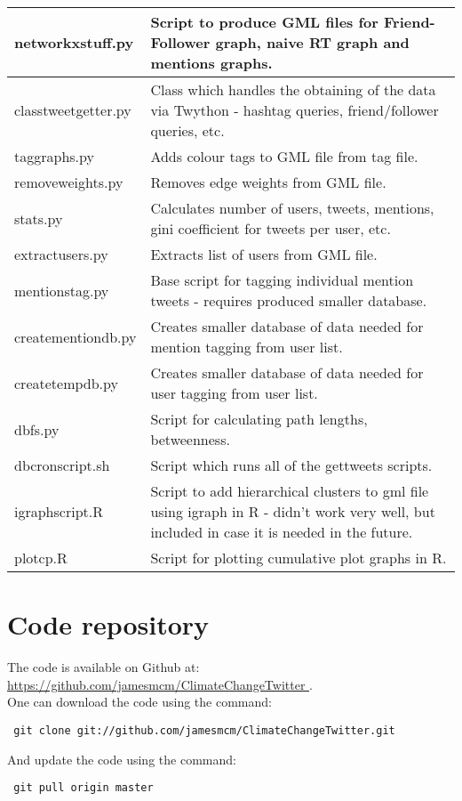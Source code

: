 \documentclass[paper=a4, fontsize=11pt]{scrartcl}
\numberwithin{equation}{section}		%
\numberwithin{figure}{section}			%
\numberwithin{table}{section}				%
\begin{document}
\begin{tabular}{l | p{11cm}}
networkxstuff.py & Script to produce GML files for Friend-Follower graph, naive RT graph and mentions graphs.\\\hline
classtweetgetter.py & Class which handles the obtaining of the data via Twython - hashtag queries, friend/follower queries, etc.\\\hline
taggraphs.py & Adds colour tags to GML file from tag file.\\\hline
removeweights.py & Removes edge weights from GML file.\\\hline
stats.py & Calculates number of users, tweets, mentions, gini coefficient for tweets per user, etc.\\\hline
extractusers.py & Extracts list of users from GML file.\\\hline
mentionstag.py & Base script for tagging individual mention tweets - requires produced smaller database.\\\hline
creatementiondb.py & Creates smaller database of data needed for mention tagging from user list.\\\hline
createtempdb.py & Creates smaller database of data needed for user tagging from user list.\\\hline
dbfs.py & Script for calculating path lengths, betweenness.\\\hline
dbcronscript.sh & Script which runs all of the gettweets scripts.\\\hline
igraphscript.R & Script to add hierarchical clusters to gml file using igraph in R - didn't work very well, but included in case it is needed in the future.\\\hline
plotcp.R & Script for plotting cumulative plot graphs in R.\\
\end{tabular}

\section{Code repository}

The code is available on Github at: \url{https://github.com/jamesmcm/ClimateChangeTwitter }.\\

One can download the code using the command: \begin{verbatim} git clone git://github.com/jamesmcm/ClimateChangeTwitter.git \end{verbatim}
And update the code using the command: \begin{verbatim} git pull origin master \end{verbatim}
\end{document}
